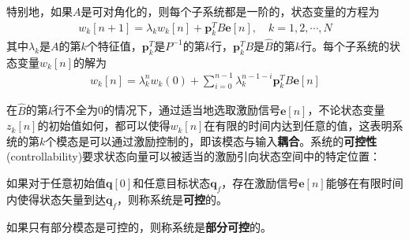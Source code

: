 特别地，如果$A$是可对角化的，则每个子系统都是一阶的，状态变量的方程为\begin{align*}
    w_k[n+1]=\lambda_k w_k[n]+\mathbf{p}_k^T B\mathbf{e}[n],\quad k=1,2,\cdots,N
\end{align*}
其中$\lambda_k$是$A$的第$k$个特征值，$\mathbf{p}_k^T$是$P^{-1}$的第$k$行，$\mathbf{p}_k^T B$是$\hat{B}$的第$k$行。每个子系统的状态变量$w_k[n]$的解为\begin{align*}
    w_k[n]=\lambda_k^n w_k(0)+\sum_{i=0}^{n-1} \lambda_k^{n-1-i}\mathbf{p}_k^TB\mathbf{e}[n]
\end{align*}

在$\hat{B}$的第$k$行不全为0的情况下，通过适当地选取激励信号$\mathbf{e}[n]$，不论状态变量$z_k[n]$的初始值如何，都可以使得$w_k[n]$在有限的时间内达到任意的值，这表明系统的第$k$个模态是可以通过激励控制的，即该模态与输入\textbf{耦合}。系统的\textbf{可控性}(controllability)要求状态向量可以被适当的激励引向状态空间中的特定位置：

\begin{definition}[可控性]
    如果对于任意初始值$\mathbf{q}[0]$和任意目标状态$\mathbf{q}_f$，存在激励信号$\mathbf{e}[n]$能够在有限时间内使得状态矢量到达$\mathbf{q}_f$，则称系统是\textbf{可控}的。

    如果只有部分模态是可控的，则称系统是\textbf{部分可控}的。
\end{definition}

